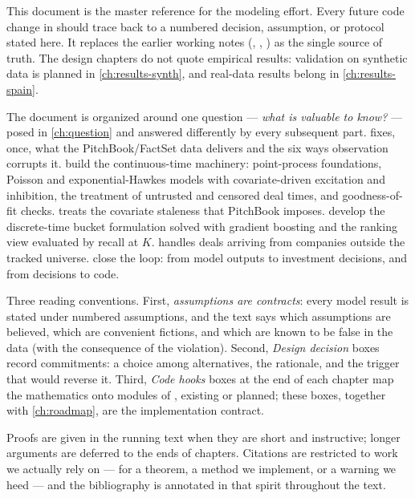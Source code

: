 
This document is the master reference for the  modeling
effort. Every future code change in \modrepo{} should trace back to a
numbered decision, assumption, or protocol stated here. It replaces the
earlier working notes (, ,
) as the single source of truth. The design chapters do
not quote empirical results: validation on synthetic data is planned in
\cref{ch:results-synth}, and real-data results belong in
\cref{ch:results-spain}.

The document is organized around one question --- \emph{what is valuable
to know?} --- posed in \cref{ch:question} and answered differently by
every subsequent part.  fixes, once, what the
PitchBook/FactSet data delivers and the six ways observation corrupts it.
 build the
continuous-time machinery: point-process foundations, Poisson and
exponential-Hawkes models with covariate-driven excitation and inhibition,
the treatment of untrusted and censored deal times, and goodness-of-fit
checks.  treats the covariate staleness that PitchBook
imposes.  develop the discrete-time bucket
formulation solved with gradient boosting and the ranking view evaluated
by recall at $K$.  handles deals arriving from companies
outside the tracked universe.  close the
loop: from model outputs to investment decisions, and from decisions to
code.

Three reading conventions. First, \emph{assumptions are contracts}: every
model result is stated under numbered assumptions, and the text says which
assumptions are believed, which are convenient fictions, and which are
known to be false in the data (with the consequence of the violation).
Second, \emph{Design decision} boxes record commitments: a choice among
alternatives, the rationale, and the trigger that would reverse it. Third,
\emph{Code hooks} boxes at the end of each chapter map the mathematics
onto modules of \modrepo{}, existing or planned; these boxes, together
with \cref{ch:roadmap}, are the implementation contract.

Proofs are given in the running text when they are short and instructive;
longer arguments are deferred to the ends of chapters. Citations are
restricted to work we actually rely on --- for a theorem, a method we
implement, or a warning we heed --- and the bibliography is annotated in
that spirit throughout the text.

